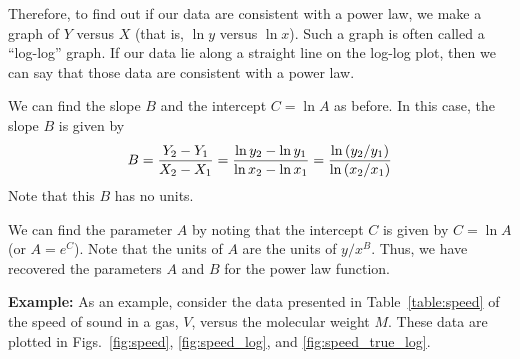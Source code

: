   Therefore, to find out if our data are consistent with a power law,
we make a graph of
$Y$ versus $X$ (that is, $\ln y$ versus $\ln x$).  Such a graph
is often called a ``log-log'' graph.  If our data lie along a straight
line on the log-log plot, then we can say that those data are consistent
with a power law.

We can find the slope $B$ and
the intercept $C= \ln A$ as before.  In this case, the slope $B$ is
given by
\[
B = {{Y_{2} - Y_{1}} \over {X_{2} - X_{1}}} =
    {{\ln y_{2} - \ln y_{1}} \over {\ln x_{2} - \ln x_{1}}} =
{\ln\left(y_2/y_1\right) \over \ln\left(x_2/x_1\right) }
\]
Note that this $B$ has no units.

We can find the parameter $A$ by noting that the intercept $C$ is
given by $C = \ln A$ (or $A = {e}^{C}$).  
Note that the units of $A$ are the units of $y/x^B$.
Thus, we have
recovered the parameters $A$ and $B$ for the power law function.


{\bf Example: } 
As an example, consider
 the data presented in
Table~\ref{table:speed} of the speed of sound in a gas, $V$, versus
the
molecular weight $M$.  These data are plotted in Figs.~\ref{fig:speed},
\ref{fig:speed_log}, and \ref{fig:speed_true_log}.



